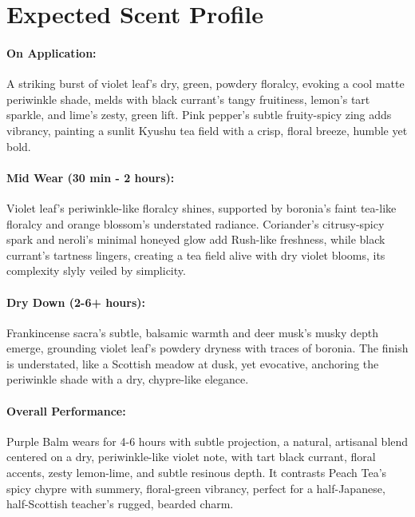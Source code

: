 \documentclass{article}
\begin{document}
\section*{Expected Scent Profile}

\paragraph{\textcolor{colaRed}{\textbf{On Application:}}}
A striking burst of violet leaf’s dry, green, powdery floralcy, evoking a cool matte periwinkle shade, melds with black currant’s tangy fruitiness, lemon’s tart sparkle, and lime’s zesty, green lift. Pink pepper’s subtle fruity-spicy zing adds vibrancy, painting a sunlit Kyushu tea field with a crisp, floral breeze, humble yet bold.

\paragraph{\textcolor{colaBrown}{\textbf{Mid Wear (30 min - 2 hours):}}}
Violet leaf’s periwinkle-like floralcy shines, supported by boronia’s faint tea-like floralcy and orange blossom’s understated radiance. Coriander’s citrusy-spicy spark and neroli’s minimal honeyed glow add Rush-like freshness, while black currant’s tartness lingers, creating a tea field alive with dry violet blooms, its complexity slyly veiled by simplicity.

\paragraph{\textcolor{colaDark}{\textbf{Dry Down (2-6+ hours):}}}
Frankincense sacra’s subtle, balsamic warmth and deer musk’s musky depth emerge, grounding violet leaf’s powdery dryness with traces of boronia. The finish is understated, like a Scottish meadow at dusk, yet evocative, anchoring the periwinkle shade with a dry, chypre-like elegance.

\paragraph{\textcolor{violetPurple}{\textbf{Overall Performance:}}}
Purple Balm wears for 4-6 hours with subtle projection, a natural, artisanal blend centered on a dry, periwinkle-like violet note, with tart black currant, floral accents, zesty lemon-lime, and subtle resinous depth. It contrasts Peach Tea’s spicy chypre with summery, floral-green vibrancy, perfect for a half-Japanese, half-Scottish teacher’s rugged, bearded charm.
\end{document}
